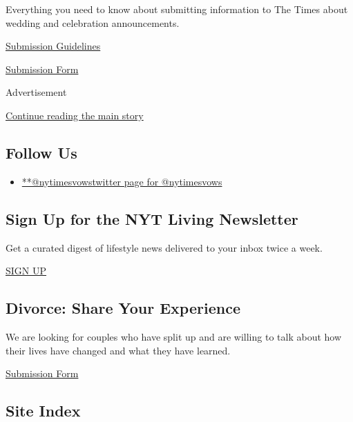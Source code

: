Everything you need to know about submitting information to The Times
about wedding and celebration announcements.

\href{https://www.nytimes3xbfgragh.onion/2018/01/09/fashion/weddings/wedding-submission-faqs.html}{Submission
Guidelines}

\href{http://www.nytimes3xbfgragh.onion/style/weddings/announcements}{Submission
Form}

Advertisement

\protect\hyperlink{after-mktg}{Continue reading the main story}

\hypertarget{follow-us}{%
\subsection{Follow Us}\label{follow-us}}

\begin{itemize}
\tightlist
\item
  \href{https://twitter.com/nytimesvows}{**@nytimesvowstwitter page for
  @nytimesvows}
\end{itemize}

\hypertarget{sign-up-for-the-nyt-living-newsletter}{%
\subsection{Sign Up for the NYT Living
Newsletter}\label{sign-up-for-the-nyt-living-newsletter}}

Get a curated digest of lifestyle news delivered to your inbox twice a
week.

\href{/newsletters/signup/LI}{SIGN UP}

\hypertarget{divorce-share-your-experience}{%
\subsection{Divorce: Share Your
Experience}\label{divorce-share-your-experience}}

We are looking for couples who have split up and are willing to talk
about how their lives have changed and what they have learned.

\href{http://www.nytimes3xbfgragh.onion/interactive/2014/style/boomer-divorce.html}{Submission
Form}

\hypertarget{site-index}{%
\subsection{Site Index}\label{site-index}}

